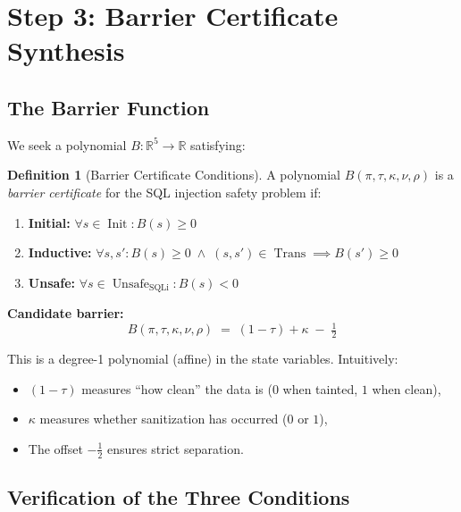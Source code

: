 \documentclass[11pt,a4paper]{article}
\theoremstyle{plain}
\theoremstyle{definition}
\newtheorem{definition}[theorem]{Definition}
\theoremstyle{remark}
\newcommand{\R}{\mathbb{R}}
\newcommand{\Init}{\operatorname{Init}}
\newcommand{\Trans}{\operatorname{Trans}}
\newcommand{\Unsafe}{\operatorname{Unsafe}}
\begin{document}
\section{Step 3: Barrier Certificate Synthesis}
\label{sec:barrier}

\subsection{The Barrier Function}

We seek a polynomial $B : \R^5 \to \R$ satisfying:

\begin{definition}[Barrier Certificate Conditions]
\label{def:barrier}
A polynomial $B(\pi, \tau, \kappa, \nu, \rho)$ is a \emph{barrier
  certificate} for the SQL injection safety problem if:
\begin{enumerate}
  \item \textbf{Initial:} $\forall s \in \Init: B(s) \geq 0$
  \item \textbf{Inductive:} $\forall s, s': B(s) \geq 0 \;\wedge\;
    (s,s') \in \Trans \implies B(s') \geq 0$
  \item \textbf{Unsafe:} $\forall s \in \Unsafe_{\text{SQLi}}: B(s) < 0$
\end{enumerate}
\end{definition}

\begin{barrierproof}
\textbf{Candidate barrier:}
\begin{equation}
  \boxed{B(\pi, \tau, \kappa, \nu, \rho)
    \;=\; (1 - \tau) + \kappa \;-\; \tfrac{1}{2}}
  \label{eq:barrier}
\end{equation}

This is a degree-1 polynomial (affine) in the state variables.
Intuitively:
\begin{itemize}[nosep]
  \item $(1-\tau)$ measures ``how clean'' the data is ($0$ when
    tainted, $1$ when clean),
  \item $\kappa$ measures whether sanitization has occurred ($0$ or $1$),
  \item The offset $-\tfrac{1}{2}$ ensures strict separation.
\end{itemize}
\end{barrierproof}

\subsection{Verification of the Three Conditions}
\end{document}
